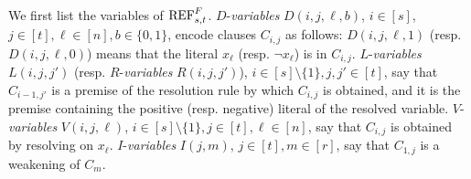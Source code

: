\documentclass[10pt,a4paper]{article}
\theoremstyle{remark}
\newtheorem*{switching lemma}{Switching Lemma}
\newtheorem*{open problem}{Open Problem}
\theoremstyle{definition}
\begin{document}
We first list the variables of $\textnormal{REF}^{F}_{s,t}$. $D$-\emph{variables} $D(i,j,\ell,b)$, $i \in [s]$, $j \in [t], \ell \in [n], b \in \{0,1\}$, encode clauses $C_{i,j}$ as follows: $D(i,j,\ell,1)$ (resp. $D(i,j,\ell,0)$) means that the literal $x_\ell$ (resp. $\neg x_\ell$) is in $C_{i,j}$.  
$L$-\emph{variables} $L(i,j,j')$ (resp. $R$-\emph{variables} $R(i,j,j')$), $i \! \in \! [s] \! \setminus \! \{1\}, j,j' \in [t]$, say that $C_{i-1,j'}$ is a premise of the resolution rule by which $C_{i,j}$ is obtained, and it is the premise containing the positive (resp. negative) literal of the resolved variable. 
$V$-\emph{variables} $V(i,j,\ell)$, $i \! \in \! [s] \! \setminus \! \{1\}, j \in [t], \ell \in [n]$, say that $C_{i,j}$ is obtained by resolving on $x_\ell$.
$I$-\emph{variables} $I(j,m)$, $j \in [t], m \in [r]$, say that $C_{1,j}$ is a weakening of $C_m$.
\end{document}

